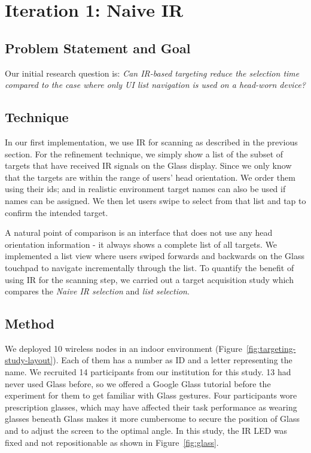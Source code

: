 
\section{Iteration 1: Naive IR}
\subsection{Problem Statement and Goal}
Our initial research question is: {\em Can IR-based targeting reduce the selection time compared to the case where only UI list navigation is used on a head-worn device?} 

\subsection{Technique}
In our first implementation, we use IR for scanning as described in the previous section. For the refinement technique, we simply show a list of the subset of targets that have received IR signals on the Glass display. Since we only know that the targets are within the range of users' head orientation. We order them using their ids; and in realistic environment target names can also be used if names can be assigned. We then let users swipe to select from that list and tap to confirm the intended target.

A natural point of comparison is an interface that does not use any head orientation information - it always shows a complete list of all targets. We implemented a list view where users swiped forwards and backwards on the Glass touchpad to navigate incrementally through the list. To quantify the benefit of using IR for the scanning step, we carried out a target acquisition study which compares the {\em Naive IR selection} and {\em list selection}.  

\subsection{Method}
We deployed 10 wireless nodes in an indoor environment (Figure~\ref{fig:targeting-study-layout}). Each of them has a number as ID and a letter representing the name. We recruited 14 participants from our institution for this study. 13 had never used Glass before, so we offered a Google Glass tutorial before the experiment for them to get familiar with Glass gestures. Four participants wore prescription glasses, which may have affected their task performance as wearing glasses beneath Glass makes it more cumbersome to secure the position of Glass and to adjust the screen to the optimal angle. In this study, the IR LED was fixed and not repositionable as shown in Figure~\ref{fig:glass}.

